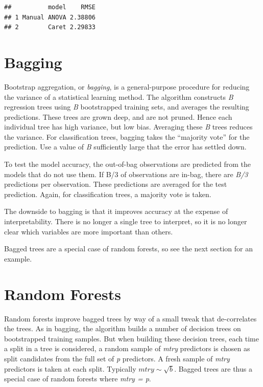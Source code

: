 \documentclass[
]{book}
\begin{document}
\begin{verbatim}
##          model    RMSE
## 1 Manual ANOVA 2.38806
## 2        Caret 2.29833
\end{verbatim}

\hypertarget{bagging}{%
\section{Bagging}\label{bagging}}

Bootstrap aggregation, or \emph{bagging}, is a general-purpose procedure for reducing the variance of a statistical learning method. The algorithm constructs \emph{B} regression trees using \emph{B} bootstrapped training sets, and averages the resulting predictions. These trees are grown deep, and are not pruned. Hence each individual tree has high variance, but low bias. Averaging these \emph{B} trees reduces the variance. For classification trees, bagging takes the ``majority vote'' for the prediction. Use a value of \emph{B} sufficiently large that the error has settled down.

To test the model accuracy, the out-of-bag observations are predicted from the models that do not use them. If B/3 of observations are in-bag, there are \emph{B/3} predictions per observation. These predictions are averaged for the test prediction. Again, for classification trees, a majority vote is taken.

The downside to bagging is that it improves accuracy at the expense of interpretability. There is no longer a single tree to interpret, so it is no longer clear which variables are more important than others.

Bagged trees are a special case of random forests, so see the next section for an example.

\hypertarget{random-forests}{%
\section{Random Forests}\label{random-forests}}

Random forests improve bagged trees by way of a small tweak that de-correlates the trees. As in bagging, the algorithm builds a number of decision trees on bootstrapped training samples. But when building these decision trees, each time a split in a tree is considered, a random sample of \emph{mtry} predictors is chosen as split candidates from the full set of \emph{p} predictors. A fresh sample of \emph{mtry} predictors is taken at each split. Typically \(mtry \sim \sqrt{b}\). Bagged trees are thus a special case of random forests where \emph{mtry = p}.
\end{document}
